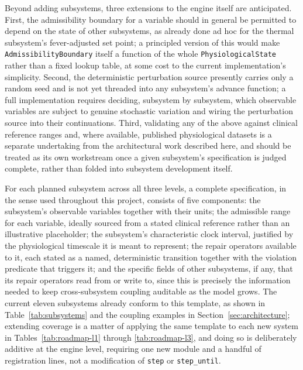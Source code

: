 \documentclass[11pt]{article}
\begin{document}
Beyond adding subsystems, three extensions to the engine itself are anticipated. First, the admissibility boundary for a variable should in general be permitted to depend on the state of other subsystems, as already done ad hoc for the thermal subsystem's fever-adjusted set point; a principled version of this would make \texttt{AdmissibilityBoundary} itself a function of the whole \texttt{PhysiologicalState} rather than a fixed lookup table, at some cost to the current implementation's simplicity. Second, the deterministic perturbation source presently carries only a random seed and is not yet threaded into any subsystem's advance function; a full implementation requires deciding, subsystem by subsystem, which observable variables are subject to genuine stochastic variation and wiring the perturbation source into their continuations. Third, validating any of the above against clinical reference ranges and, where available, published physiological datasets is a separate undertaking from the architectural work described here, and should be treated as its own workstream once a given subsystem's specification is judged complete, rather than folded into subsystem development itself.

For each planned subsystem across all three levels, a complete specification, in the sense used throughout this project, consists of five components: the subsystem's observable variables together with their units; the admissible range for each variable, ideally sourced from a stated clinical reference rather than an illustrative placeholder; the subsystem's characteristic clock interval, justified by the physiological timescale it is meant to represent; the repair operators available to it, each stated as a named, deterministic transition together with the violation predicate that triggers it; and the specific fields of other subsystems, if any, that its repair operators read from or write to, since this is precisely the information needed to keep cross-subsystem coupling auditable as the model grows. The current eleven subsystems already conform to this template, as shown in Table~\ref{tab:subsystems} and the coupling examples in Section~\ref{sec:architecture}; extending coverage is a matter of applying the same template to each new system in Tables~\ref{tab:roadmap-l1} through \ref{tab:roadmap-l3}, and doing so is deliberately additive at the engine level, requiring one new module and a handful of registration lines, not a modification of \texttt{step} or \texttt{step\_until}.
\end{document}
